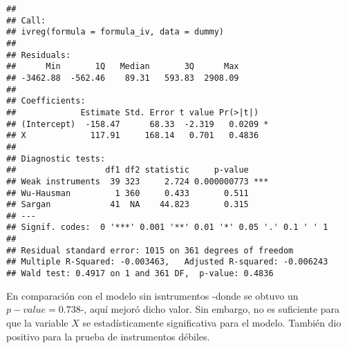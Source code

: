\documentclass[
]{article}
\begin{document}
\begin{verbatim}
## 
## Call:
## ivreg(formula = formula_iv, data = dummy)
## 
## Residuals:
##      Min       1Q   Median       3Q      Max 
## -3462.88  -562.46    89.31   593.83  2908.09 
## 
## Coefficients:
##             Estimate Std. Error t value Pr(>|t|)  
## (Intercept)  -158.47      68.33  -2.319   0.0209 *
## X             117.91     168.14   0.701   0.4836  
## 
## Diagnostic tests:
##                  df1 df2 statistic     p-value    
## Weak instruments  39 323     2.724 0.000000773 ***
## Wu-Hausman         1 360     0.433       0.511    
## Sargan            41  NA    44.823       0.315    
## ---
## Signif. codes:  0 '***' 0.001 '**' 0.01 '*' 0.05 '.' 0.1 ' ' 1
## 
## Residual standard error: 1015 on 361 degrees of freedom
## Multiple R-Squared: -0.003463,   Adjusted R-squared: -0.006243 
## Wald test: 0.4917 on 1 and 361 DF,  p-value: 0.4836
\end{verbatim}

En comparación con el modelo sin isntrumentos -donde se obtuvo un
\(p-value = 0.738\)-, aquí mejoró dicho valor. Sin embargo, no es
suficiente para que la variable \(X\) se estadísticamente significativa
para el modelo. También dio positivo para la prueba de instrumentos
débiles.
\end{document}
